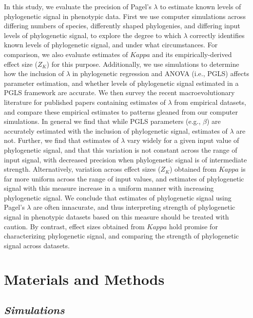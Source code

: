 \documentclass[
]{article}
\begin{document}
In this study, we evaluate the precision of Pagel's \(\lambda\) to
estimate known levels of phylogenetic signal in phenotypic data. First
we use computer simulations across differing numbers of species,
differently shaped phylogenies, and differing input levels of
phylogenetic signal, to explore the degree to which \(\lambda\)
correctly identifies known levels of phylogenetic signal, and under what
circumstances. For comparison, we also evaluate estimates of \(Kappa\)
and its empirically-derived effect size (\(Z_K\)) for this purpose.
Additionally, we use simulations to determine how the inclusion of
\(\lambda\) in phylogenetic regression and ANOVA (i.e., PGLS) affects
parameter estimation, and whether levels of phylogenetic signal
estimated in a PGLS framework are accurate. We then survey the recent
macroevolutionary literature for published papers containing estimates
of \(\lambda\) from empirical datasets, and compare these empirical
estimates to patterns gleaned from our computer simulations. In general
we find that while PGLS parameters (e.g., \(\beta\)) are accurately
estimated with the inclusion of phylogenetic signal, estimates of
\(\lambda\) are not. Further, we find that estimates of \(\lambda\) vary
widely for a given input value of phylogenetic signal, and that this
variation is not constant across the range of input signal, with
decreased precision when phylogenetic signal is of intermediate
strength. Alternatively, variation across effect sizes (\(Z_K\))
obtained from \(Kappa\) is far more uniform across the range of input
values, and estimates of phylogenetic signal with this measure increase
in a uniform manner with increasing phylogenetic signal. We conclude
that estimates of phylogenetic signal using Pagel's \(\lambda\) are
often innacurate, and thus interpreting strength of phylogenetic signal
in phenotypic datasets based on this measure should be treated with
caution. By contrast, effect sizes obtained from \(Kappa\) hold promise
for characterizing phylogenetic signal, and comparing the strength of
phylogenetic signal across datasets.

\hypertarget{materials-and-methods}{%
\section{Materials and Methods}\label{materials-and-methods}}

\hypertarget{simulations}{%
\subsection{\texorpdfstring{\emph{Simulations}}{Simulations}}\label{simulations}}
\end{document}
